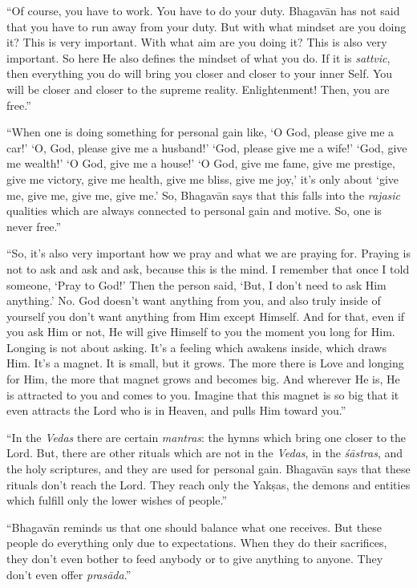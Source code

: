 \enquote{Of course, you have to work. You have to do your duty. Bhagavān has not said that you have to run away from your duty. But with what mindset are you doing it? This is very important. With what aim are you doing it? This is also very important. So here He also defines the mindset of what you do. If it is \textit{sattvic}, then everything you do will bring you closer and closer to your inner Self. You will be closer and closer to the supreme reality. Enlightenment! Then, you are free.}

\enquote{When one is doing something for personal gain like, \enquote{O God, please give me a car!} \enquote{O, God, please give me a husband!} \enquote{God, please give me a wife!} \enquote{God, give me wealth!} \enquote{O God, give me a house!} \enquote{O God, give me fame, give me prestige, give me victory, give me health, give me bliss, give me joy,} it’s only about \enquote{give me, give me, give me, give me.} So, Bhagavān says that this falls into the \textit{rajasic} qualities which are always connected to personal gain and motive. So, one is never free.}

\enquote{So, it’s also very important how we pray and what we are praying for. Praying is not to ask and ask and ask, because this is the mind. I remember that once I told someone, \enquote{Pray to God!} Then the person said, \enquote{But, I don’t need to ask Him anything.} No. God doesn’t want anything from you, and also truly inside of yourself you don’t want anything from Him except Himself. And for that, even if you ask Him or not, He will give Himself to you the moment you long for Him. Longing is not about asking. It’s a feeling which awakens inside, which draws Him. It’s a magnet. It is small, but it grows. The more there is Love and longing for Him, the more that magnet grows and becomes big. And wherever He is, He is attracted to you and comes to you. Imagine that this magnet is so big that it even attracts the Lord who is in Heaven, and pulls Him toward you.}

\enquote{In the \textit{Vedas} there are certain \textit{mantras}: the hymns which bring one closer to the Lord. But, there are other rituals which are not in the \textit{Vedas}, in the \textit{śāstras}, and the holy scriptures, and they are used for personal gain. Bhagavān says that these rituals don’t reach the Lord. They reach only the Yakṣas, the demons and entities which fulfill only the lower wishes of people.}

\enquote{Bhagavān reminds us that one should balance what one receives. But these people do everything only due to expectations. When they do their sacrifices, they don’t even bother to feed anybody or to give anything to anyone. They don’t even offer \textit{prasāda}.}

